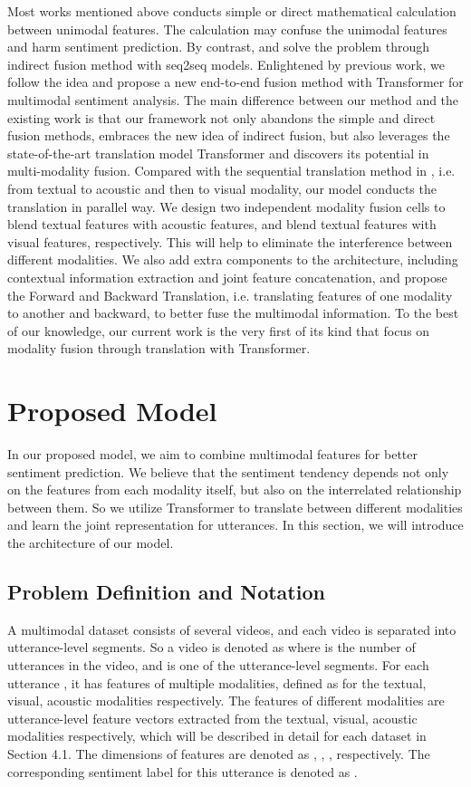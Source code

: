 \documentclass[sigconf]{acmart}
\begin{document}
	Most works mentioned above conducts simple or direct mathematical calculation between unimodal features. The calculation may confuse the unimodal features and harm sentiment prediction. By contrast, \citet{pham2018seq2seq2sentiment} and \citet{pham2018found} solve the problem through indirect fusion method with seq2seq models. Enlightened by previous work, we follow the idea and propose a new end-to-end fusion method with Transformer for multimodal sentiment analysis. The main difference between our method and the existing work is that our framework not only abandons the simple and direct fusion methods, embraces the new idea of indirect fusion, but also leverages the state-of-the-art translation model Transformer and discovers its potential in multi-modality fusion. Compared with the sequential translation method in \citet{pham2018seq2seq2sentiment,pham2018found}, i.e. from textual to acoustic and then to visual modality, our model conducts the translation in parallel way. We design two independent modality fusion cells to blend textual features with acoustic features, and blend textual features with visual features, respectively.  This will help to eliminate the interference between different modalities. We also add extra components to the architecture, including contextual information extraction and joint feature concatenation, and propose the Forward and Backward Translation, i.e. translating features of one modality to another and backward, to better fuse the multimodal information. To the best of our knowledge, our current work is the very first of its kind that focus on modality fusion through translation with Transformer.
	
	\section{Proposed Model}
	In our proposed model, we aim to combine multimodal features for better sentiment prediction. We believe that the sentiment tendency depends not only on the features from each modality itself, but also on the interrelated relationship between them. So we utilize Transformer to translate between different modalities and learn the joint representation for utterances. In this section, we will introduce the architecture of our model.
	
	\subsection{Problem Definition and Notation}
	A multimodal dataset consists of several videos, and each video is separated into utterance-level segments. So a video  is denoted as  where  is the number of utterances in the video, and  is one of the utterance-level segments. For each utterance , it has features of multiple modalities, defined as  for the textual, visual, acoustic modalities respectively. The features of different modalities are utterance-level feature vectors extracted from the textual, visual, acoustic modalities respectively, which will be described in detail for each dataset in Section 4.1. The dimensions of features are denoted as , , , respectively. The corresponding sentiment label for this utterance is denoted as .
	
\end{document}
